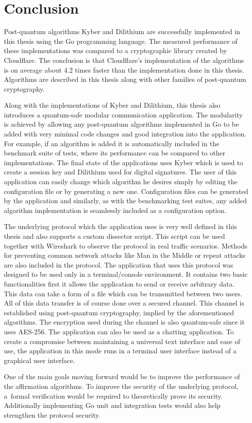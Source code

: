 \chapter*{Conclusion}
{}

Post-quantum algorithms Kyber and Dilithium are successfully implemented in this thesis using the Go programming language. The measured performance of these implementations was compared to a cryptographic library created by Cloudflare. The conclusion is that Cloudflare's implementation of the algorithms is on average about 4.2 times faster than the implementation done in this thesis. Algorithms are described in this thesis along with other families of post-quantum cryptography.

Along with the implementations of Kyber and Dilithium, this thesis also introduces a quantum-safe modular communication application. The modularity is achieved by allowing any post-quantum algorithms implemented in Go to be added with very minimal code changes and good integration into the application. For example, if an algorithm is added it is automatically included in the benchmark suite of tests, where its performance can be compared to other implementations. The final state of the applications uses Kyber which is used to create a session key and Dilithium used for digital signatures. The user of this application can easily change which algorithm he desires simply by editing the configuration file or by generating a new one. Configuration files can be generated by the application and similarly, as with the benchmarking test suites, any added algorithm implementation is seamlessly included as a configuration option.

The underlying protocol which the application uses is very well defined in this thesis and also supports a custom dissector script. This script can be used together with Wireshark to observe the protocol in real traffic scenarios. Methods for preventing common network attacks like Man in the Middle or repeat attacks are also included in the protocol. The application that uses this protocol was designed to be used only in a terminal/console environment. It contains two basic functionalities first it allows the application to send or receive arbitrary data. This data can take a form of a file which can be transmitted between two users. All of this data transfer is of course done over a secured channel. This channel is established using post-quantum cryptography, implied by the aforementioned algorithms. The encryption used during the channel is also quantum-safe since it uses AES-256. The application can also be used as a chatting application. To create a compromise between maintaining a universal text interface and ease of use, the application in this mode runs in a terminal user interface instead of a graphical user interface.

One of the main goals moving forward would be to improve the performance of the affirmation algorithms. To improve the security of the underlying protocol, a~formal verification would be required to theoretically prove its security. Additionally implementing Go unit and integration tests would also help strengthen the protocol security.
